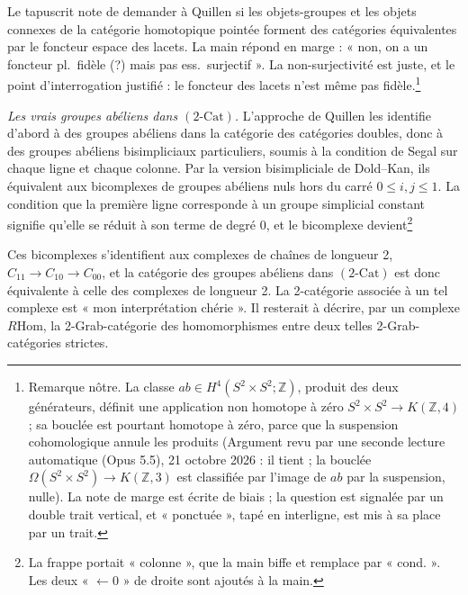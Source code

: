 \documentclass[11pt,a4paper]{article}
\begin{document}
Le tapuscrit note de demander à Quillen si les objets-groupes et les objets
connexes de la catégorie homotopique pointée forment des catégories
équivalentes par le foncteur espace des lacets. La main répond en marge :
« non, on a un foncteur pl.\ fidèle (?) mais pas ess.\ surjectif ». La
non-surjectivité est juste, et le point d'interrogation justifié : le foncteur
des lacets n'est même pas fidèle.\footnote{Remarque nôtre. La classe $ab \in
H^{4}(S^{2} \times S^{2}; \mathbb{Z})$, produit des deux générateurs, définit
une application non homotope à zéro $S^{2} \times S^{2} \to K(\mathbb{Z}, 4)$ ;
sa bouclée est pourtant homotope à zéro, parce que la suspension cohomologique annule les produits (Argument revu par une seconde lecture automatique (Opus 5.5), 21 octobre 2026 : il tient ; la bouclée $\Omega(S^{2} \times S^{2}) \to K(\mathbb{Z}, 3)$ est classifiée par l'image de $ab$ par la suspension, nulle). La note de marge est écrite de biais ; la
question est signalée par un double trait vertical, et « ponctuée », tapé en
interligne, est mis à sa place par un trait.}

\emph{Les vrais groupes abéliens dans $(2\text{-Cat})$.} L'approche de Quillen
les identifie d'abord à des groupes abéliens dans la catégorie des catégories
doubles, donc à des groupes abéliens bisimpliciaux particuliers, soumis à la
condition de Segal sur chaque ligne et chaque colonne. Par la version
bisimpliciale de Dold--Kan, ils équivalent aux bicomplexes de groupes abéliens
nuls hors du carré $0 \leq i, j \leq 1$. La condition que la première ligne
corresponde à un groupe simplicial constant signifie qu'elle se réduit à son
terme de degré 0, et le bicomplexe devient\footnote{La frappe portait
« colonne », que la main biffe et remplace par « cond. ». Les deux
« $\leftarrow 0$ » de droite sont ajoutés à la main.}


Ces bicomplexes s'identifient aux complexes de chaînes de longueur 2,
$C_{11} \to C_{10} \to C_{00}$, et la catégorie des groupes abéliens dans
$(2\text{-Cat})$ est donc équivalente à celle des complexes de longueur 2. La
2-catégorie associée à un tel complexe est « mon interprétation chérie ». Il
resterait à décrire, par un complexe $R\mathrm{Hom}$, la 2-Grab-catégorie des
homomorphismes entre deux telles 2-Grab-catégories strictes.
\end{document}
